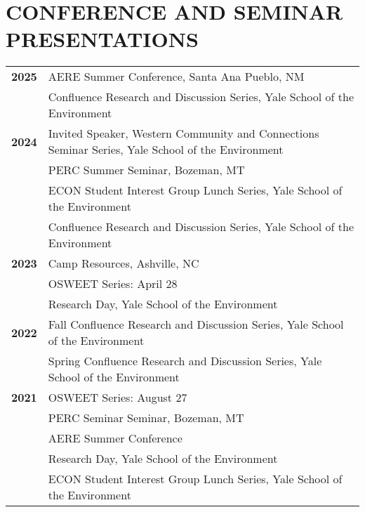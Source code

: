 \documentclass[11pt]{article}
\begin{document}
\section*{CONFERENCE AND SEMINAR PRESENTATIONS}
\begin{tabularx}{\linewidth}{>{\bfseries}r X} %
2025 & AERE Summer Conference, Santa Ana Pueblo, NM \\ 
    & Confluence Research and Discussion Series, Yale School of the Environment \\[1ex]
2024 & Invited Speaker, Western Community and Connections Seminar Series, Yale School of the Environment \\
    & PERC Summer Seminar, Bozeman, MT \\
    & ECON Student Interest Group Lunch Series, Yale School of the Environment \\
    & Confluence Research and Discussion Series, Yale School of the Environment \\[1ex]
2023 & Camp Resources, Ashville, NC \\
    & OSWEET Series: April 28 \\
    & Research Day, Yale School of the Environment  \\[1ex]
2022 & Fall Confluence Research and Discussion Series, Yale School of the Environment \\
    & Spring Confluence Research and Discussion Series, Yale School of the Environment \\[1ex]
2021 & OSWEET Series: August 27 \\
    & PERC Seminar Seminar, Bozeman, MT \\
    & AERE Summer Conference \\
    & Research Day, Yale School of the Environment  \\
    & ECON Student Interest Group Lunch Series, Yale School of the Environment
\end{tabularx}
\end{document}
